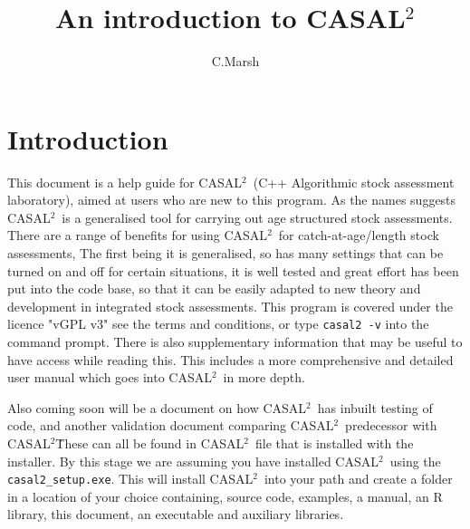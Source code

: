 \documentclass[12pt]{article}
\newcommand{\CAS}{CASAL$^2$}
\begin{document}
	\title{An introduction to CASAL$^2$}
	\author{C.Marsh}
	\maketitle
\section{Introduction}\label{sec:intro}
This document is a help guide for \CAS\ (C++ Algorithmic stock assessment laboratory), aimed at users who are new to this program. As the names suggests \CAS\ is a generalised tool for carrying out age structured stock assessments. There are a range of benefits for using \CAS\ for catch-at-age/length stock assessments, The first being it is generalised, so has many settings that can be turned on and off for certain situations, it is well tested and great effort has been put into the code base, so that it can be easily adapted to new theory and development in integrated stock assessments. 
This program is covered under the licence "vGPL v3" see the terms and conditions, or type \texttt{casal2 -v} into the command prompt. There is also supplementary information that may be useful to have access while reading this. This includes a more comprehensive and detailed user manual which goes into \CAS\ in more depth. 


Also coming soon will be a document on how \CAS\ has inbuilt testing of code, and another validation document comparing \CAS\ predecessor with \CAS\. These can all be found in \CAS\ file that is installed with the installer. By this stage we are assuming you have installed \CAS\ using the \texttt{casal2\_setup.exe}. This will install \CAS\ into your path and create a folder in a location of your choice containing, source code, examples, a manual, an R library, this document, an executable and auxiliary libraries.
\end{document}
